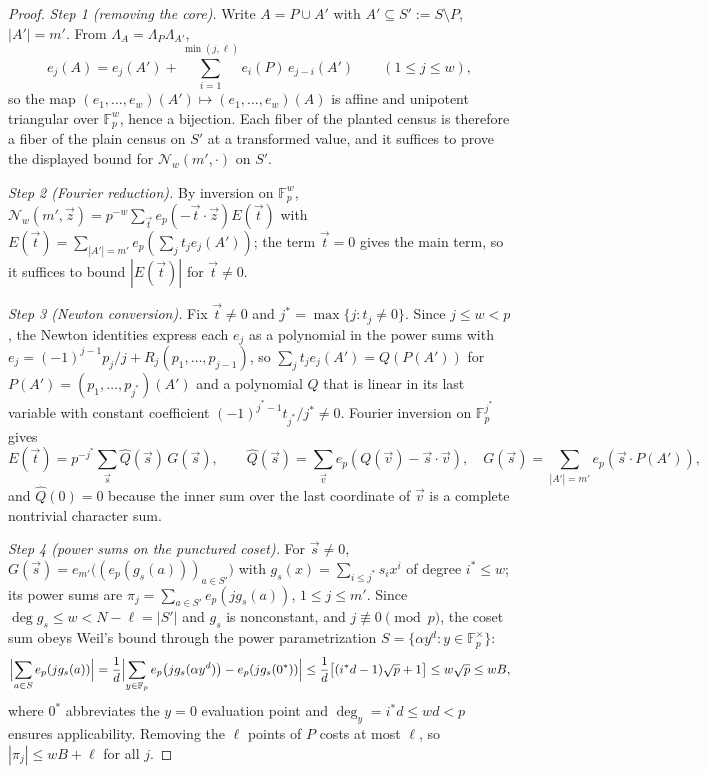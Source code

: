 \documentclass[11pt]{article}
\theoremstyle{definition}
\theoremstyle{remark}
\newcommand{\F}{\mathbb{F}}
\begin{document}
\begin{proof}
\emph{Step 1 (removing the core).}  Write $A=P\cup A'$ with $A'\subseteq S':=S\setminus P$, $|A'|=m'$.  From $\Lambda_A=\Lambda_P\Lambda_{A'}$,
\[
        e_j(A)=e_j(A')+\sum_{i=1}^{\min(j,\ell)}e_i(P)\,e_{j-i}(A')\qquad(1\le j\le w),
\]
so the map $(e_1,\ldots,e_w)(A')\mapsto(e_1,\ldots,e_w)(A)$ is affine and unipotent triangular over $\F_p^w$, hence a bijection.  Each fiber of the planted census is therefore a fiber of the plain census on $S'$ at a transformed value, and it suffices to prove the displayed bound for $\mathcal N_w(m',\cdot)$ on $S'$.

\emph{Step 2 (Fourier reduction).}  By inversion on $\F_p^w$, $\mathcal N_w(m',\vec z)=p^{-w}\sum_{\vec t}e_p(-\vec t\cdot\vec z)E(\vec t)$ with $E(\vec t)=\sum_{|A'|=m'}e_p(\sum_jt_je_j(A'))$; the term $\vec t=0$ gives the main term, so it suffices to bound $|E(\vec t)|$ for $\vec t\ne0$.

\emph{Step 3 (Newton conversion).}  Fix $\vec t\ne0$ and $j^*=\max\{j:t_j\ne0\}$.  Since $j\le w<p$, the Newton identities express each $e_j$ as a polynomial in the power sums with $e_j=(-1)^{j-1}p_j/j+R_j(p_1,\ldots,p_{j-1})$, so $\sum_jt_je_j(A')=Q(P(A'))$ for $P(A')=(p_1,\ldots,p_{j^*})(A')$ and a polynomial $Q$ that is linear in its last variable with constant coefficient $(-1)^{j^*-1}t_{j^*}/j^*\ne0$.  Fourier inversion on $\F_p^{j^*}$ gives
\[
        E(\vec t)=p^{-j^*}\sum_{\vec s}\widehat Q(\vec s)\,G(\vec s),\qquad
        \widehat Q(\vec s)=\sum_{\vec v}e_p(Q(\vec v)-\vec s\cdot\vec v),\quad
        G(\vec s)=\sum_{|A'|=m'}e_p(\vec s\cdot P(A')),
\]
and $\widehat Q(0)=0$ because the inner sum over the last coordinate of $\vec v$ is a complete nontrivial character sum.

\emph{Step 4 (power sums on the punctured coset).}  For $\vec s\ne0$, $G(\vec s)=e_{m'}\bigl((e_p(g_s(a)))_{a\in S'}\bigr)$ with $g_s(x)=\sum_{i\le j^*}s_ix^i$ of degree $i^*\le w$; its power sums are $\pi_j=\sum_{a\in S'}e_p(jg_s(a))$, $1\le j\le m'$.  Since $\deg g_s\le w<N-\ell=|S'|$ and $g_s$ is nonconstant, and $j\not\equiv0\pmod p$, the coset sum obeys Weil's bound through the power parametrization $S=\{\alpha y^d:y\in\F_p^\times\}$:
\[
        \Bigl|\sum_{a\in S}e_p(jg_s(a))\Bigr|
        =\frac1d\Bigl|\sum_{y\in\F_p}e_p\bigl(jg_s(\alpha y^d)\bigr)-e_p(jg_s(0^{\ast}))\Bigr|
        \le\frac1d\bigl[(i^*d-1)\sqrt p+1\bigr]\le w\sqrt p\le wB,
\]
where $0^\ast$ abbreviates the $y=0$ evaluation point and $\deg_y=i^*d\le wd<p$ ensures applicability.  Removing the $\ell$ points of $P$ costs at most $\ell$, so $|\pi_j|\le wB+\ell$ for all $j$.


\end{proof}
\end{document}
